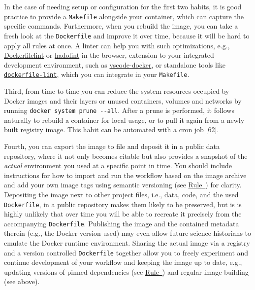 \documentclass[10pt,letterpaper]{article}
\begin{document}
In the case of needing setup or configuration for the first two habits,
it is good practice to provide a \texttt{Makefile} alongside your
container, which can capture the specific commands. Furthermore, when
you rebuild the image, you can take a fresh look at the
\texttt{Dockerfile} and improve it over time, because it will be hard to
apply all rules at once. A linter can help you with such optimizations,
e.g., \href{https://www.dockerfilelint.com/}{Dockerfilelint} or
\href{https://hadolint.github.io/hadolint/}{hadolint} in the browser,
extension to your integrated development environment, such as
\href{https://github.com/microsoft/vscode-docker}{vscode-docker}, or
standalone tools like
\href{https://github.com/projectatomic/dockerfile_lint}{\texttt{dockerfile-lint}},
which you can integrate in your \texttt{Makefile}.

Third, from time to time you can reduce the system resources occupied by
Docker images and their layers or unused containers, volumes and
networks by running \texttt{docker\ system\ prune\ -\/-all}. After a
prune is performed, it follows naturally to rebuild a container for
local usage, or to pull it again from a newly built registry image. This
habit can be automated with a cron job {[}62{]}.

Fourth, you can export the image to file and deposit it in a public data
repository, where it not only becomes citable but also provides a
snapshot of the \emph{actual} environment you used at a specific point
in time. You should include instructions for how to import and run the
workflow based on the image archive and add your own image tags using
semantic versioning (see
\hyperref[{rule:base}]{Rule~}) for clarity.
Depositing the image next to other project files, i.e., data, code, and
the used \texttt{Dockerfile}, in a public repository makes them likely
to be preserved, but is is highly unlikely that over time you will be
able to recreate it precisely from the accompanying \texttt{Dockerfile}.
Publishing the image and the contained metadata therein (e.g., the
Docker version used) may even allow future science historians to emulate
the Docker runtime environment. Sharing the actual image via a registry
and a version controlled \texttt{Dockerfile} together allow you to
freely experiment and continue development of your workflow and keeping
the image up to date, e.g., updating versions of pinned dependencies
(see \hyperref[{rule:pinning}]{Rule~}) and
regular image building (see above).
\end{document}
